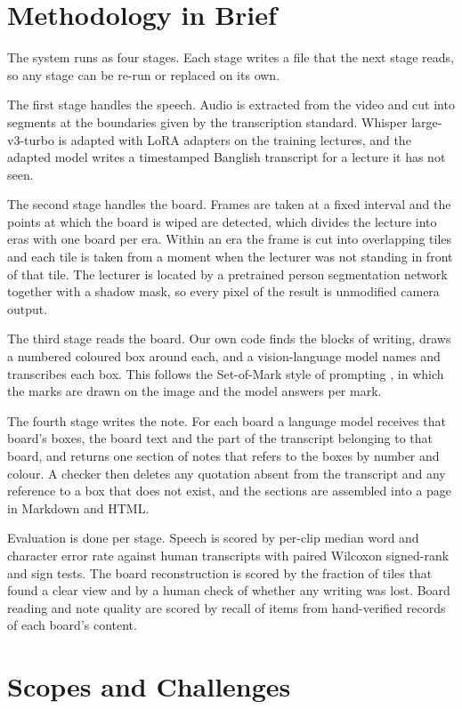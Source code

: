 \section{Methodology in Brief}

The system runs as four stages. Each stage writes a file that the next stage reads, so
any stage can be re-run or replaced on its own.

The first stage handles the speech. Audio is extracted from the video and cut into
segments at the boundaries given by the transcription standard. Whisper large-v3-turbo is
adapted with LoRA adapters on the training lectures, and the adapted model writes a
timestamped Banglish transcript for a lecture it has not seen.

The second stage handles the board. Frames are taken at a fixed interval and the points
at which the board is wiped are detected, which divides the lecture into eras with one
board per era. Within an era the frame is cut into overlapping tiles and each tile is
taken from a moment when the lecturer was not standing in front of that tile. The
lecturer is located by a pretrained person segmentation network together with a shadow
mask, so every pixel of the result is unmodified camera output.

The third stage reads the board. Our own code finds the blocks of writing, draws a
numbered coloured box around each, and a vision-language model names and transcribes each
box. This follows the Set-of-Mark style of prompting \cite{yang2023som}, in which the
marks are drawn on the image and the model answers per mark.

The fourth stage writes the note. For each board a language model receives that board's
boxes, the board text and the part of the transcript belonging to that board, and returns
one section of notes that refers to the boxes by number and colour. A checker then
deletes any quotation absent from the transcript and any reference to a box that does not
exist, and the sections are assembled into a page in Markdown and HTML.

Evaluation is done per stage. Speech is scored by per-clip median word and character
error rate against human transcripts with paired Wilcoxon signed-rank and sign tests. The
board reconstruction is scored by the fraction of tiles that found a clear view and by a
human check of whether any writing was lost. Board reading and note quality are scored by
recall of items from hand-verified records of each board's content.

\section{Scopes and Challenges}

